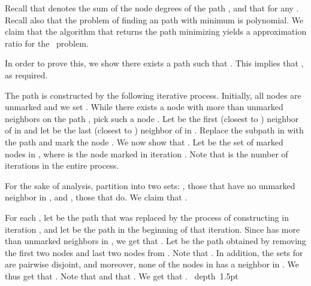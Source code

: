 \documentclass[12pt]{article}
\def\blackslug{\hbox{\hskip 1pt \vrule width 4pt height 8pt
    depth 1.5pt \hskip 1pt}}
\def\QED{\quad\blackslug\lower 8.5pt\null\par}
\newcommand{\PP}[0]{ }
\begin{document}
Recall that  denotes the sum of the node degrees of the path , and that  for any . Recall also that the problem of finding an  path  with minimum  is polynomial. We claim that the algorithm that returns the path  minimizing  yields a  approximation ratio for the \PP\ problem.

In order to prove this, we show there exists a path  such that .
This implies that , as required.

The path  is constructed by the following iterative process.
Initially, all nodes are unmarked and we set .
While there exists a node with more than  unmarked neighbors on the path , pick such a node .
Let  be the first (closest to ) neighbor of  in  and let  be the last (closest to ) neighbor of  in .
Replace the subpath  in  with the path  and mark the node .
We now show that .
Let  be the set of marked nodes in , where  is the node marked in iteration .
Note that  is the number of iterations in the entire process.

For the sake of analysis, partition  into two sets: , those that have no unmarked neighbor in , and , those that do.
We claim that .

For each , let  be the path that was replaced by the process of constructing  in iteration , and let  be the path  in the beginning of that iteration.
Since  has more than  unmarked neighbors in , we get that .
Let  be the path obtained by removing the first two nodes and last two nodes from .
Note that .
In addition, the sets  for  are pairwise disjoint, and moreover, none of the nodes in  has a neighbor in .
We thus get that .
Note that  and that .
We get that .
\QED
\end{document}
